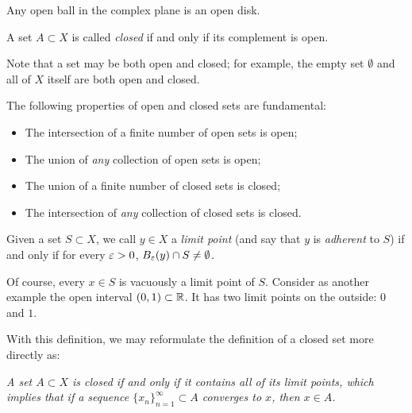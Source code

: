 Any open ball in the complex plane is an open disk.

\begin{definition}
	A set $A \subset X$ is called \textit{closed} if and only if its complement is open.
\end{definition}

Note that a set may be both open and closed; for example, the empty set $\emptyset$ and all of $X$ itself are both open and closed.

The following properties of open and closed sets are fundamental:

\begin{itemize}
	\item The intersection of a finite number of open sets is open;
	\item The union of \textit{any} collection of open sets is open;
	\item The union of a finite number of closed sets is closed;
	\item The intersection of \textit{any} collection of closed sets is closed.
\end{itemize}

\begin{definition}
	Given a set $S \subset X$, we call $y \in X$ a \emph{limit point} (and say that $y$ is \emph{adherent} to $S$) if and only if for every $\varepsilon>0$, $B_{\varepsilon}(y) \cap S \neq \emptyset$.
\end{definition}

Of course, every $x \in S$ is vacuously a limit point of $S$. Consider as another example the open interval $(0,1) \subset \mathbb R$. It has two limit points on the outside: $0$ and $1$.

With this definition, we may reformulate the definition of a closed set more directly as:
\begin{center}
	\textit{A set $A \subset X$ is closed if and only if it contains all of its limit points, which implies that if a sequence $\{x_n\}_{n=1}^{\infty} \subset A$ converges to $x$, then $x \in A$.}
\end{center}

